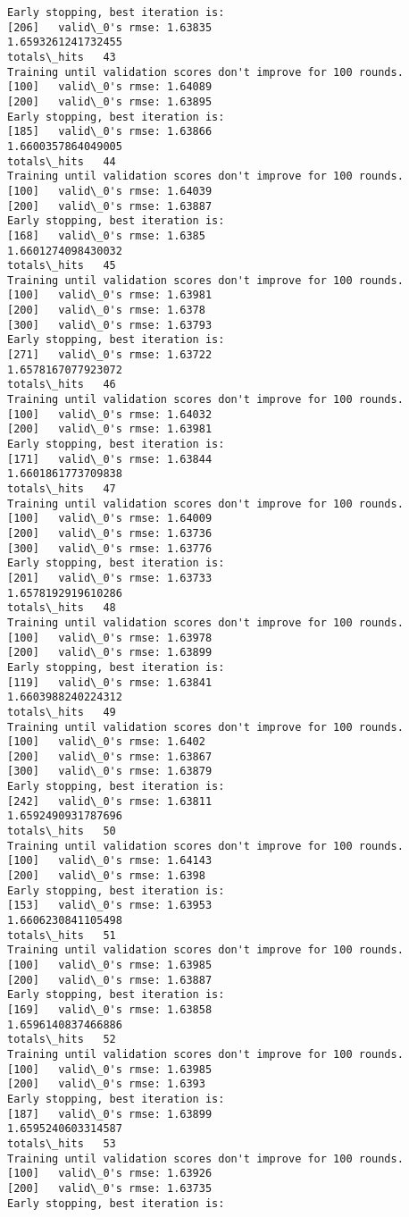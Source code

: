 \documentclass[11pt]{article}
\begin{document}
\begin{Verbatim}[commandchars=\\\{\}]
Early stopping, best iteration is:
[206]	valid\_0's rmse: 1.63835
1.6593261241732455
totals\_hits   43
Training until validation scores don't improve for 100 rounds.
[100]	valid\_0's rmse: 1.64089
[200]	valid\_0's rmse: 1.63895
Early stopping, best iteration is:
[185]	valid\_0's rmse: 1.63866
1.6600357864049005
totals\_hits   44
Training until validation scores don't improve for 100 rounds.
[100]	valid\_0's rmse: 1.64039
[200]	valid\_0's rmse: 1.63887
Early stopping, best iteration is:
[168]	valid\_0's rmse: 1.6385
1.6601274098430032
totals\_hits   45
Training until validation scores don't improve for 100 rounds.
[100]	valid\_0's rmse: 1.63981
[200]	valid\_0's rmse: 1.6378
[300]	valid\_0's rmse: 1.63793
Early stopping, best iteration is:
[271]	valid\_0's rmse: 1.63722
1.6578167077923072
totals\_hits   46
Training until validation scores don't improve for 100 rounds.
[100]	valid\_0's rmse: 1.64032
[200]	valid\_0's rmse: 1.63981
Early stopping, best iteration is:
[171]	valid\_0's rmse: 1.63844
1.6601861773709838
totals\_hits   47
Training until validation scores don't improve for 100 rounds.
[100]	valid\_0's rmse: 1.64009
[200]	valid\_0's rmse: 1.63736
[300]	valid\_0's rmse: 1.63776
Early stopping, best iteration is:
[201]	valid\_0's rmse: 1.63733
1.6578192919610286
totals\_hits   48
Training until validation scores don't improve for 100 rounds.
[100]	valid\_0's rmse: 1.63978
[200]	valid\_0's rmse: 1.63899
Early stopping, best iteration is:
[119]	valid\_0's rmse: 1.63841
1.6603988240224312
totals\_hits   49
Training until validation scores don't improve for 100 rounds.
[100]	valid\_0's rmse: 1.6402
[200]	valid\_0's rmse: 1.63867
[300]	valid\_0's rmse: 1.63879
Early stopping, best iteration is:
[242]	valid\_0's rmse: 1.63811
1.6592490931787696
totals\_hits   50
Training until validation scores don't improve for 100 rounds.
[100]	valid\_0's rmse: 1.64143
[200]	valid\_0's rmse: 1.6398
Early stopping, best iteration is:
[153]	valid\_0's rmse: 1.63953
1.6606230841105498
totals\_hits   51
Training until validation scores don't improve for 100 rounds.
[100]	valid\_0's rmse: 1.63985
[200]	valid\_0's rmse: 1.63887
Early stopping, best iteration is:
[169]	valid\_0's rmse: 1.63858
1.6596140837466886
totals\_hits   52
Training until validation scores don't improve for 100 rounds.
[100]	valid\_0's rmse: 1.63985
[200]	valid\_0's rmse: 1.6393
Early stopping, best iteration is:
[187]	valid\_0's rmse: 1.63899
1.6595240603314587
totals\_hits   53
Training until validation scores don't improve for 100 rounds.
[100]	valid\_0's rmse: 1.63926
[200]	valid\_0's rmse: 1.63735
Early stopping, best iteration is:

\end{Verbatim}
\end{document}
